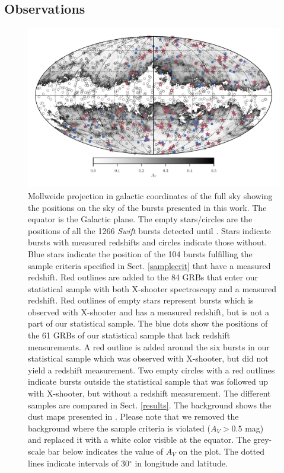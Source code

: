 \documentclass{aa}    %
\begin{document}
\subsection{Observations} \label{obs}


\begin{figure}
	\centerline{\includegraphics{figures/skymap.pdf}} \caption{Mollweide projection
	in galactic coordinates of the full sky showing the positions on the sky of the
	bursts presented in this work. The equator is the Galactic plane. The empty
	stars/circles are the positions of all the 1266 \textit{Swift} bursts detected
	until \termdate. Stars indicate bursts with measured redshifts and circles
	indicate those without. Blue stars indicate the position of the 104 bursts
	fulfilling the sample criteria specified in Sect. \ref{samplecrit} that have a
	measured redshift. Red outlines are added to the 84 GRBs that enter our
	statistical sample with both X-shooter spectroscopy and a measured redshift.
	Red outlines of empty stars represent bursts which is observed with X-shooter
	and has a measured redshift, but is not a part of our statistical sample. The
	blue dots show the positions of the 61 GRBs of our statistical sample that lack
	redshift measurements. A red outline is added around the six bursts in our
	statistical sample which was observed with X-shooter, but did not yield a
	redshift measurement. Two empty circles with a red outlines indicate bursts
	outside the statistical sample that was followed up with X-shooter, but without
	a redshift measurement. The different samples are compared in Sect.
	\ref{results}. The background shows the dust maps presented in
	\citet{Schlegel1998}. Please note that we removed the background where the
	sample criteria is violated ($A_V > 0.5$ mag) and replaced it with a white
	color visible at the equator. The grey-scale bar below indicates the value of
	$A_V$ on the plot. The dotted lines indicate intervals of 30$^\circ$ in
	longitude and latitude.} \label{fig:skymap}
\end{figure}
\end{document}
